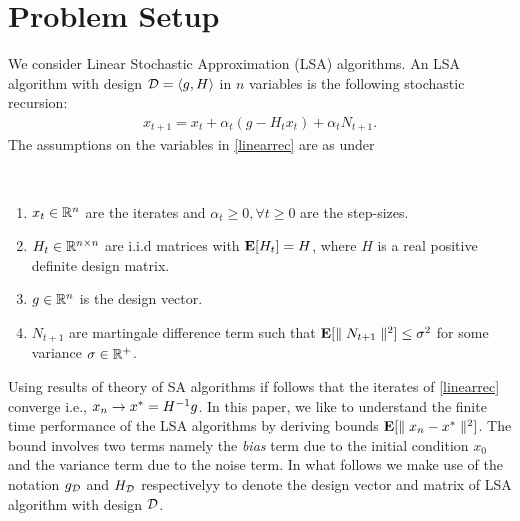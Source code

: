 \section{Problem Setup}
We consider Linear Stochastic Approximation (LSA) algorithms. An LSA algorithm with design $\mathcal{D}=\langle g,H\rangle$ in $n$ variables is the following stochastic recursion:
\begin{align}\label{linearrec}
x_{t+1}=x_t+\alpha_t(g-H_t x_t)+\alpha_t N_{t+1}.
\end{align}
The assumptions on the variables in \eqref{linearrec} are as under
\begin{assumption}\label{lsaassump}
\hspace{10pt}\\
\vspace{-20pt}
\begin{enumerate}[leftmargin=*]
\item $x_t\in \mathbb{R}^n$ are the iterates and $\alpha_t\geq 0 ,\forall t\geq 0$ are the step-sizes.
\item\label{pd} $H_t\in \mathbb{R}^{n\times n}$ are i.i.d matrices with $\mathbf{E}[H_t]=H$, where $H$ is a real positive definite design matrix.
\item $g\in \mathbb{R}^n$ is the design vector.
\item $N_{t+1}$ are martingale difference term such that $\mathbf{E}[\parallel N_{t+1} \parallel^2]\leq \sigma^2$ for some variance $\sigma\in \mathbb{R}^+$.
\end{enumerate}
\end{assumption}
Using results of theory of SA algorithms if follows that the iterates of \eqref{linearrec} converge i.e., $x_n\rightarrow x^*=H^{-1}g$. In this paper, we like to understand the finite time performance of the LSA algorithms by deriving bounds $\mathbf{E}[\parallel x_n-x^*\parallel^2]$. The bound involves two terms namely the \emph{bias} term due to the initial condition $x_0$ and the variance term due to the noise term. In what follows we make use of the notation $g_{\mathcal{D}}$ and $H_{\mathcal{D}}$ respectivelyy to denote the design vector and matrix of LSA algorithm with design $\mathcal{D}$.
